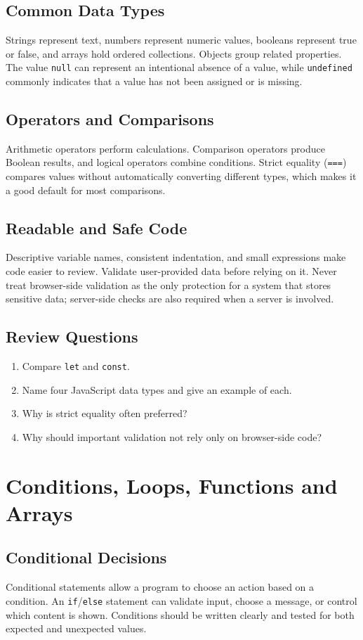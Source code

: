 \documentclass[11pt,openany,oneside]{book}
\begin{document}
\section{Common Data Types}
Strings represent text, numbers represent numeric values, booleans represent true or false, and arrays hold ordered collections. Objects group related properties. The value \texttt{null} can represent an intentional absence of a value, while \texttt{undefined} commonly indicates that a value has not been assigned or is missing.

\section{Operators and Comparisons}
Arithmetic operators perform calculations. Comparison operators produce Boolean results, and logical operators combine conditions. Strict equality (\texttt{===}) compares values without automatically converting different types, which makes it a good default for most comparisons.

\section{Readable and Safe Code}
Descriptive variable names, consistent indentation, and small expressions make code easier to review. Validate user-provided data before relying on it. Never treat browser-side validation as the only protection for a system that stores sensitive data; server-side checks are also required when a server is involved.

\section*{Review Questions}
\begin{enumerate}
\item Compare \texttt{let} and \texttt{const}.
\item Name four JavaScript data types and give an example of each.
\item Why is strict equality often preferred?
\item Why should important validation not rely only on browser-side code?
\end{enumerate}

\chapter{Conditions, Loops, Functions and Arrays}
\section{Conditional Decisions}
Conditional statements allow a program to choose an action based on a condition. An \texttt{if}/\texttt{else} statement can validate input, choose a message, or control which content is shown. Conditions should be written clearly and tested for both expected and unexpected values.
\end{document}
